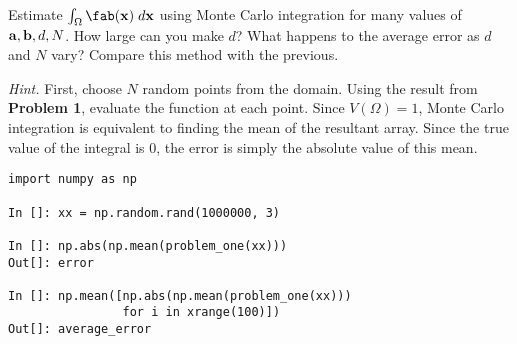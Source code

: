 \break
\begin{problem}
\label{prob:mc}
Estimate $\int_{\Omega} \fab({\bf x}) \;d{\bf x}$ using Monte Carlo integration
for many values of ${\bf a}, {\bf b}, d, N$. How large can you make $d$? What
happens to the average error as $d$ and $N$ vary? Compare this method with the
previous.

\nopagebreak[2]

\vspace{5mm}
\noindent
{\it Hint.} First, choose $N$ random points from the domain. Using the result
from {\bf Problem 1}, evaluate the function at each point. Since $V(\Omega) =
1$, Monte Carlo integration is equivalent to finding the mean of the resultant
array. Since the true value of the integral is $0$, the error is simply the
absolute value of this mean.

\nopagebreak[2]

\begin{verbatim}
import numpy as np

In []: xx = np.random.rand(1000000, 3)

In []: np.abs(np.mean(problem_one(xx)))
Out[]: error

In []: np.mean([np.abs(np.mean(problem_one(xx)))
                for i in xrange(100)])
Out[]: average_error
\end{verbatim}
\end{problem}

\let\fab\undefined
